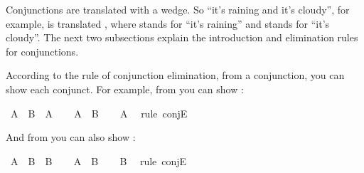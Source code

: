 \begin{isabellebody}
%
\endisatagproof
{\isafoldproof}%
%
\isadelimproof
%
\endisadelimproof
%
\isadelimdocument
%
\endisadelimdocument
%
\isatagdocument
%
\isamarkuptrue%
%
\endisatagdocument
{\isafolddocument}%
%
\isadelimdocument
%
\endisadelimdocument
%
\begin{isamarkuptext}%
Conjunctions are translated with a wedge. So ``it's raining and it's cloudy'', for example,
is translated , where  stands for ``it's raining'' and  stands
for ``it's cloudy''. The next two subsections explain the introduction and elimination rules for
conjunctions.%
\end{isamarkuptext}\isamarkuptrue%
%
\isadelimdocument
%
\endisadelimdocument
%
\isatagdocument
%
\isamarkuptrue%
%
\endisatagdocument
{\isafolddocument}%
%
\isadelimdocument
%
\endisadelimdocument
%
\begin{isamarkuptext}%
According to the rule of conjunction elimination, from a conjunction, you can show each
conjunct. For example, from  you can show :%
\end{isamarkuptext}\isamarkuptrue%
\isamarkupfalse%
\ {\isachardoublequoteopen}A\ {\isasymand}\ B\ {\isasymlongrightarrow}\ A{\isachardoublequoteclose}\isanewline
%
\isadelimproof
%
\endisadelimproof
%
\isatagproof
{}\isamarkupfalse%
\isanewline
\ \ \isamarkupfalse%
\ {\isachardoublequoteopen}A\ {\isasymand}\ B{\isachardoublequoteclose}\isanewline
\ \ \isamarkupfalse%
\ {\isachardoublequoteopen}A{\isachardoublequoteclose}\ \isamarkupfalse%
\ {\isacharparenleft}rule\ conjE{\isacharparenright}\isanewline
{}\isamarkupfalse%
%
\endisatagproof
{\isafoldproof}%
%
\isadelimproof
%
\endisadelimproof
%
\begin{isamarkuptext}%
And from  you can also show :%
\end{isamarkuptext}\isamarkuptrue%
\isamarkupfalse%
\ {\isachardoublequoteopen}A\ {\isasymand}\ B\ {\isasymlongrightarrow}\ B{\isachardoublequoteclose}\isanewline
%
\isadelimproof
%
\endisadelimproof
%
\isatagproof
{}\isamarkupfalse%
\isanewline
\ \ \isamarkupfalse%
\ {\isachardoublequoteopen}A\ {\isasymand}\ B{\isachardoublequoteclose}\isanewline
\ \ \isamarkupfalse%
\ {\isachardoublequoteopen}B{\isachardoublequoteclose}\ \isamarkupfalse%
\ {\isacharparenleft}rule\ conjE{\isacharparenright}\isanewline

\end{isabellebody}
